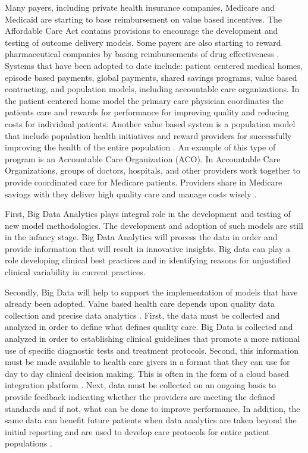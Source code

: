 \documentclass[sigconf]{acmart}
\begin{document}
Many payers, including private health insurance companies, Medicare and Medicaid are starting to base reimbursement on value based incentives. The Affordable Care Act contains provisions to encourage the development and testing of outcome delivery models.  Some payers are also starting to reward pharmaceutical companies by basing reimbursements of drug effectiveness \cite{www-google-McKinsey}. 
Systems that have been adopted to date include: patient centered medical homes, episode based payments, global payments, shared savings programs, value based contracting, and population models, including accountable care organizations.  In the patient centered home model the primary care physician coordinates the patients care and rewards for performance for improving quality and reducing costs for individual patients. Another value based system is a population model that include population health initiatives and reward providers for successfully improving the health of the entire population \cite{www-google-liason}. An example of this type of program is an Accountable Care Organization (ACO). In Accountable Care Organizations, groups of doctors, hospitals, and other providers work together to provide coordinated care for Medicare patients. Providers share in Medicare savings with they deliver high quality care and manage costs wisely \cite{www-google-ACO}.
 
First, Big Data Analytics plays integral role in the development and testing of new model methodologies. The development and adoption of such models are still in the infancy stage.  Big Data Analytics will process the data in order and provide information that will result in innovative insights.  Big data can play a role developing clinical best practices and in identifying reasons for unjustified clinical variability in current practices.

Secondly, Big Data will help to support the implementation of models that have already been adopted. Value based health care depends upon quality data collection and precise data analytics \cite{www-google-liason}.  First, the data must be collected and analyzed in order to define what defines quality care. Big Data is collected and analyzed in order to establishing clinical guidelines that promote a more rational use of specific diagnostic tests and treatment protocols.  Second, this information must be made available to health care givers in a format that they can use for day to day clinical decision making. This is often in the form of a cloud based integration platform \cite{www-google-liason}.  Next, data must be collected on an ongoing basis to provide feedback indicating whether the providers are meeting the defined standards and if not, what can be done to improve performance. In addition, the same data can benefit future patients when data analytics are taken beyond the initial reporting and are used to develop care protocols for entire patient populations \cite{www-google-liason}. 
\end{document}

